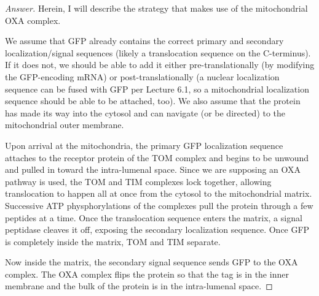 \documentclass[../psets.tex]{subfiles}
\begin{document}
\begin{enumerate}
    \begin{proof}[Answer]
        Herein, I will describe the strategy that makes use of the mitochondrial OXA complex.\par
        We assume that GFP already contains the correct primary and secondary localization/signal sequences (likely a translocation sequence on the C-terminus). If it does not, we should be able to add it either pre-translationally (by modifying the GFP-encoding mRNA) or post-translationally (a nuclear localization sequence can be fused with GFP per Lecture 6.1, so a mitochondrial localization sequence should be able to be attached, too). We also assume that the protein has made its way into the cytosol and can navigate (or be directed) to the mitochondrial outer membrane.\par
        Upon arrival at the mitochondria, the primary GFP localization sequence attaches to the receptor protein of the TOM complex and begins to be unwound and pulled in toward the intra-lumenal space. Since we are supposing an OXA pathway is used, the TOM and TIM complexes lock together, allowing translocation to happen all at once from the cytosol to the mitochondrial matrix. Successive ATP physphorylations of the complexes pull the protein through a few peptides at a time. Once the translocation sequence enters the matrix, a signal peptidase cleaves it off, exposing the secondary localization sequence. Once GFP is completely inside the matrix, TOM and TIM separate.\par
        Now inside the matrix, the secondary signal sequence sends GFP to the OXA complex. The OXA complex flips the protein so that the tag is in the inner membrane and the bulk of the protein is in the intra-lumenal space.
    \end{proof}
\end{enumerate}
\end{document}
